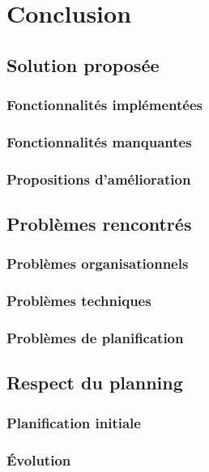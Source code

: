 \documentclass[11pt,a4paper,oldfontcommands]{memoir}
\begin{document}
\chapter{Conclusion}

\section{Solution proposée}

\subsection{Fonctionnalités implémentées}

\subsection{Fonctionnalités manquantes}

\subsection{Propositions d'amélioration}

\section{Problèmes rencontrés}

\subsection{Problèmes organisationnels}

\subsection{Problèmes techniques}

\subsection{Problèmes de planification}

\section{Respect du planning}

\subsection{Planification initiale}

\subsection{Évolution}
\end{document}
